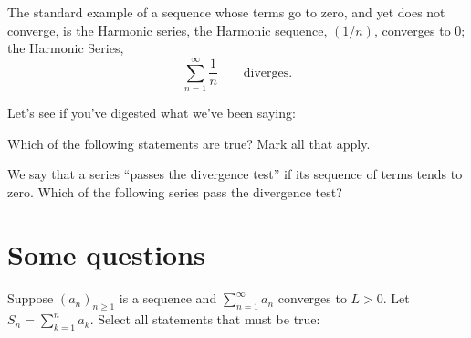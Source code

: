 \documentclass{ximera}
\begin{document}
The standard example of a sequence whose terms go to zero, and yet does
not converge, is the Harmonic series, the Harmonic sequence,
$(1/n)$, converges to $0$; the Harmonic Series,
\[
\sum_{n=1}^\infty\frac{1}{n}\qquad\text{diverges.}
\]

Let's see if you've digested what we've been saying:

\begin{question}
Which of the following statements are true?  Mark all that apply.
\begin{selectAll}
\end{selectAll}
\end{question}


\begin{question}
  We say that a series ``passes the divergence test'' if its sequence
  of terms tends to zero.  Which of the following series pass the
  divergence test?
\begin{selectAll}
\end{selectAll}
\end{question}


\section{Some questions}

\begin{question}
  Suppose $(a_n)_{n \geq 1}$ is a sequence and $\sum^{\infty}_{n= 1}
  a_n$ converges to $L>0$.  Let $S_n = \sum^n_{k=1} a_k$. Select all
  statements that must be true:
  \begin{selectAll}
  \end{selectAll}
\end{question}
\end{document}
